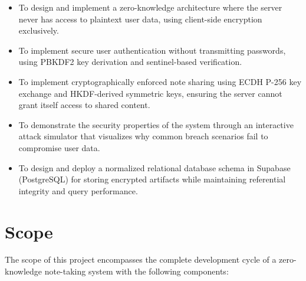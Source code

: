 \begin{itemize}
    \item To design and implement a zero-knowledge architecture where the server never has access to plaintext user data, using client-side encryption exclusively.
    \item To implement secure user authentication without transmitting passwords, using PBKDF2 key derivation and sentinel-based verification.
    \item To implement cryptographically enforced note sharing using ECDH P-256 key exchange and HKDF-derived symmetric keys, ensuring the server cannot grant itself access to shared content.
    \item To demonstrate the security properties of the system through an interactive attack simulator that visualizes why common breach scenarios fail to compromise user data.
    \item To design and deploy a normalized relational database schema in Supabase (PostgreSQL) for storing encrypted artifacts while maintaining referential integrity and query performance.
\end{itemize}

\section{Scope}

The scope of this project encompasses the complete development cycle of a zero-knowledge note-taking system with the following components:

